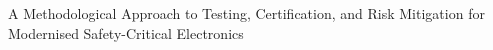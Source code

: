 A Methodological Approach to Testing, Certification, and Risk Mitigation for Modernised Safety-Critical Electronics